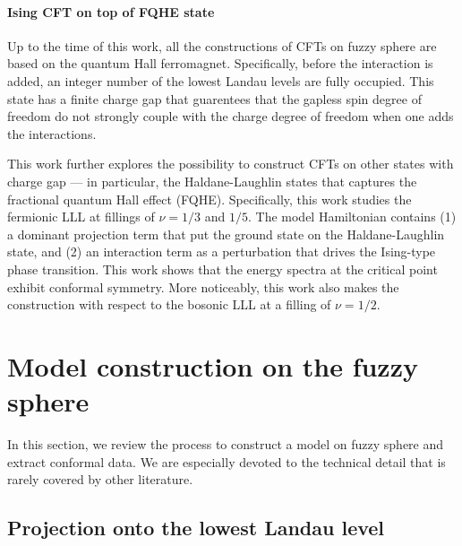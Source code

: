\documentclass{timesjhep}
\begin{document}
\paragraph{Ising CFT on top of FQHE state~\cite{Voinea2024}}

Up to the time of this work, all the constructions of CFTs on fuzzy sphere are based on the quantum Hall ferromagnet. Specifically, before the interaction is added, an integer number of the lowest Landau levels are fully occupied. This state has a finite charge gap that guarentees that the gapless spin degree of freedom do not strongly couple with the charge degree of freedom when one adds the interactions. 

This work further explores the possibility to construct CFTs on other states with charge gap --- in particular, the Haldane-Laughlin states that captures the fractional quantum Hall effect (FQHE). Specifically, this work studies the fermionic LLL at fillings of $\nu=1/3$ and $1/5$. The model Hamiltonian contains (1) a dominant projection term that put the ground state on the Haldane-Laughlin state, and (2) an interaction term as a perturbation that drives the Ising-type phase transition. This work shows that the energy spectra at the critical point exhibit conformal symmetry. More noticeably, this work also makes the construction with respect to the bosonic LLL at a filling of $\nu=1/2$. 

\section{Model construction on the fuzzy sphere}
\label{sec:construct}

In this section, we review the process to construct a model on fuzzy sphere and extract conformal data. We are especially devoted to the technical detail that is rarely covered by other literature. 

\subsection{Projection onto the lowest Landau level}
\label{sec:setup}
\end{document}
